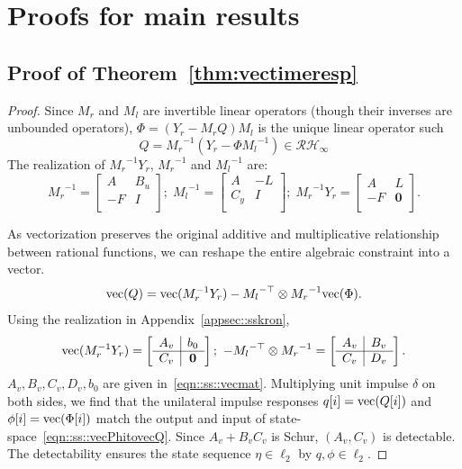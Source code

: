 \section{Proofs for main results}\label{sec:app_vecssana}
\subsection{Proof of Theorem~\ref{thm:vectimeresp}}
\begin{proof}
Since \(M_r\) and \(M_l\) are invertible linear operators (though their inverses are unbounded operators), \(\Phi = (Y_r - M_r Q) M_l\) is the unique linear operator such \[
Q = {M_r}^{-1}(Y_r -  \Phi {M_l}^{-1}) \in \mathcal{RH}_\infty
\]
The realization of \({M_r}^{-1} Y_r\), \({M_r}^{-1}\) and \({M_l}^{-1}\) are:
\begin{equation}
    {M_r}^{-1} = \left[
    \begin{array}{c|c}
        A & B_u \\
        \hline
        -F & I \\
    \end{array}\right];\;    
    {M_l}^{-1} = \left[
    \begin{array}{c|c}
        A & -L \\
        \hline
        C_y & I \\
    \end{array}\right];\; 
    {M_r}^{-1}Y_r = \left[
    \begin{array}{c|c}
        A & L \\
        \hline
        -F & \mathbf{0} \\
    \end{array}\right].
\end{equation}

As vectorization preserves the original additive and multiplicative relationship between rational functions, we can reshape the entire algebraic constraint into a vector.
\begin{equation}\label{eqn::QPhirelation}
    {\mathrm{vec}}(Q) = {\mathrm{vec}}(M_r^{-1}Y_r)-{M_l}^{-\top} \otimes {M_r}^{-1} {\mathrm{vec}}(\Phi).
\end{equation}
Using the realization in Appendix~\ref{appsec::sskron},
\[
 \vc(M_r^{-1}Y_r) = \left[
    \begin{array}{c|c}
        A_v & b_0 \\
        \hline
        C_v & \mathbf{0} \\
    \end{array}\right];\ 
- {M_l}^{-\top} \otimes {M_r}^{-1} =
\left[\begin{array}{c|c}
    A_v & B_v \\
    \hline
    C_v & D_v \\
\end{array}\right].
\]
\(A_v,B_v,C_v,D_v,b_0\) are given in~\eqref{eqn::ss::vecmat}. Multiplying unit impulse \(\delta\) on both sides, we find that the unilateral impulse responses \(q[i] ={\mathrm{vec}}(Q[i])\) and \(\phi[i] ={\mathrm{vec}}(\Phi[i])\) match the output and input of state-space~\eqref{eqn::ss::vecPhitovecQ}. 
Since \(A_v +B_v C_v\) is Schur, \((A_v, C_v)\) is detectable. The detectability ensures the state sequence \(\eta\in\ell_2\) by \(q,\phi \in\ell_2\).
\end{proof}
